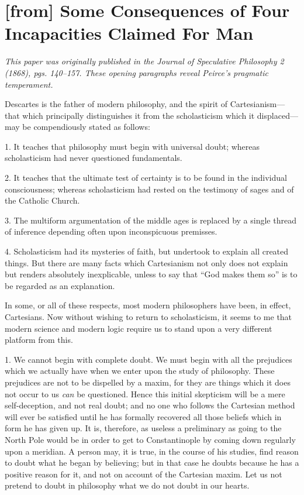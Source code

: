 \documentclass[]{article}
\begin{document}
\section*{[from] Some Consequences of Four Incapacities Claimed For Man}
\emph{This paper was originally published in the \emph{Journal of Speculative Philosophy} 2 (1868), pgs. 140--157. These opening paragraphs reveal Peirce's pragmatic temperament.}

Descartes is the father of modern philosophy, and the spirit of Cartesianism--- that which principally distinguishes it from the scholasticism which it displaced--- may be compendiously stated as follows:

1. It teaches that philosophy must begin with universal doubt; whereas scholasticism had never questioned fundamentals.

2. It teaches that the ultimate test of certainty is to be found in the individual consciousness; whereas scholasticism had rested on the testimony of sages and of the Catholic Church.

3. The multiform argumentation of the middle ages is replaced by a single thread of inference depending often upon inconspicuous premisses.

4. Scholasticism had its mysteries of faith, but undertook to explain all created things. But there are many facts which Cartesianism not only does not explain but renders absolutely inexplicable, unless to say that ``God makes them so'' is to be regarded as an explanation.

In some, or all of these respects, most modern philosophers have been, in effect, Cartesians. Now without wishing to return to scholasticism, it seems to me that modern science and modern logic require us to stand upon a very different platform from this.

1. We cannot begin with complete doubt. We must begin with all the prejudices which we actually have when we enter upon the study of philosophy. These prejudices are not to be dispelled by a maxim, for they are things which it does not occur to us \emph{can} be questioned. Hence this initial skepticism will be a mere self-deception, and not real doubt; and no one who follows the Cartesian method will ever be satisfied until he has formally recovered all those beliefs which in form he has given up. It is, therefore, as useless a preliminary as going to the North Pole would be in order to get to Constantinople by coming down regularly upon a meridian. A person may, it is true, in the course of his studies, find reason to doubt what he began by believing; but in that case he doubts because he has a positive reason for it, and not on account of the Cartesian maxim. Let us not pretend to doubt in philosophy what we do not doubt in our hearts.
\end{document}
